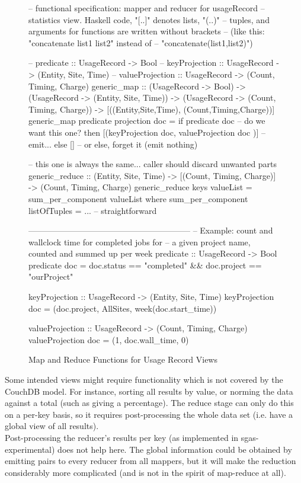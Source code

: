 \begin{figure}
\begin{code}
-- functional specification: mapper and reducer for usageRecord
-- statistics view. Haskell code, "[..]" denotes lists, "(..)"
-- tuples, and arguments for functions are written without brackets
-- (like this: "concatenate list1 list2" instead of
-- "concatenate(list1,list2)")

-- predicate :: UsageRecord -> Bool
-- keyProjection   :: UsageRecord -> (Entity, Site, Time)
-- valueProjection :: UsageRecord -> (Count, Timing, Charge)
generic_map :: (UsageRecord -> Bool) -> 
               (UsageRecord -> (Entity, Site, Time)) ->
               (UsageRecord -> (Count, Timing, Charge)) -> 
               [((Entity,Site,Time), (Count,Timing,Charge))]
generic_map predicate projection doc
    = if predicate doc -- do we want this one?
        then [(keyProjection doc, valueProjection doc )] -- emit...
        else [] -- or else, forget it (emit nothing)

-- this one is always the same... caller should discard unwanted parts
generic_reduce :: (Entity, Site, Time) -> 
                  [(Count, Timing, Charge)] -> (Count, Timing, Charge)
generic_reduce keys valueList = sum_per_component valueList
    where sum_per_component listOfTuples = ... -- straightforward

-----------------------------------------------------------
-- Example: count and wallclock time for completed jobs for
-- a given project name, counted and summed up per week
predicate :: UsageRecord -> Bool
predicate doc = doc.status == "completed" 
                && doc.project == "ourProject"

keyProjection :: UsageRecord -> (Entity, Site, Time)
keyProjection doc = (doc.project, AllSites, week(doc.start_time))

valueProjection :: UsageRecord -> (Count, Timing, Charge)
valueProjection doc = (1, doc.wall_time, 0)
\end{code}
\caption{Map and Reduce Functions for Usage Record Views}
\label{functions}
\end{figure}

Some intended views might require functionality which is not covered
by the CouchDB model. For instance, sorting all results by value, or
norming the data against a total (such as giving a percentage). The
reduce stage can only do this on a per-key basis, so it requires
post-processing the whole data set (i.e. have a global view of all
results).\\
%
Post-processing the reducer's results per key (as implemented in
sgas-experimental) does not help here. The global information could be
obtained by emitting pairs to every reducer from all mappers, but it
will make the reduction considerably more complicated (and is not in
the spirit of map-reduce at all).


